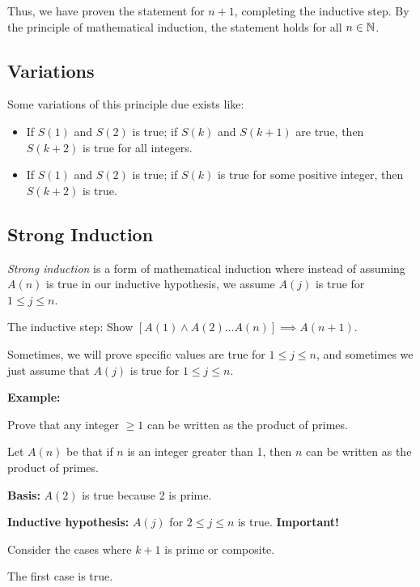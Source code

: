 Thus, we have proven the statement for \( n + 1 \), completing the inductive step. By the principle of mathematical induction, the
statement holds for all \( n \in \mathbb{N} \).

\QED

\subsection{Variations}

Some variations of this principle due exists like:

\begin{itemize}

	\item If \(S(1)\) and \(S(2)\) is true; if \(S(k)\) and \(S(k + 1)\) are true, then \(S(k + 2)\) is true for all integers.

	\item If \(S(1)\) and \(S(2)\) is true; if \(S(k)\) is true for some positive integer, then \(S(k + 2)\) is true.

\end{itemize}

\subsection{Strong Induction}

\emph{Strong induction} is a form of mathematical induction where instead of assuming \(A(n)\) is true in our
inductive hypothesis, we assume \(A(j)\) is true for \(1 \le j \le n\).

The inductive step: Show \([A(1) \land A(2) \dots A(n)] \implies A(n + 1)\).

Sometimes, we will prove specific values are true for \(1 \le j \le n\), and sometimes we just assume that
\(A(j)\) is true for \(1 \le j \le n\).

\textbf{Example:}

Prove that any integer \(\ge 1\) can be written as the product of primes.

Let \(A(n)\) be that if \(n\) is an integer greater than 1, then \(n\) can be written as the product of
primes.

\textbf{Basis: } \(A(2)\) is true because 2 is prime.

\textbf{Inductive hypothesis:} \(A(j)\) for \(2 \le j \le n\) is true. \textbf{Important!}

Consider the cases where \(k + 1\) is prime or composite.

The first case is true.


